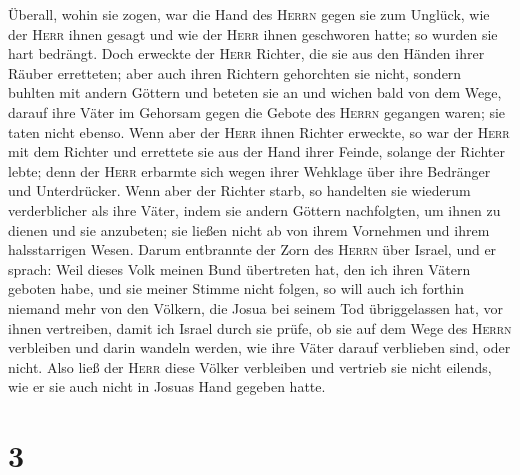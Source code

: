 Überall, wohin sie zogen, war die Hand des \textsc{Herrn} gegen sie zum
Unglück, wie der \textsc{Herr} ihnen gesagt und wie der \textsc{Herr}
ihnen geschworen hatte; so wurden sie hart bedrängt. 
Doch erweckte der \textsc{Herr} Richter, die sie aus den Händen ihrer
Räuber erretteten;  aber auch ihren Richtern gehorchten
sie nicht, sondern buhlten mit andern Göttern und beteten sie an und
wichen bald von dem Wege, darauf ihre Väter im Gehorsam gegen die Gebote
des \textsc{Herrn} gegangen waren; sie taten nicht ebenso.
 Wenn aber der \textsc{Herr} ihnen Richter erweckte, so
war der \textsc{Herr} mit dem Richter und errettete sie aus der Hand
ihrer Feinde, solange der Richter lebte; denn der \textsc{Herr} erbarmte
sich wegen ihrer Wehklage über ihre Bedränger und Unterdrücker.
 Wenn aber der Richter starb, so handelten sie wiederum
verderblicher als ihre Väter, indem sie andern Göttern nachfolgten, um
ihnen zu dienen und sie anzubeten; sie ließen nicht ab von ihrem
Vornehmen und ihrem halsstarrigen Wesen.  Darum
entbrannte der Zorn des \textsc{Herrn} über Israel, und er sprach: Weil
dieses Volk meinen Bund übertreten hat, den ich ihren Vätern geboten
habe, und sie meiner Stimme nicht folgen,  so will auch
ich forthin niemand mehr von den Völkern, die Josua bei seinem Tod
übriggelassen hat, vor ihnen vertreiben,  damit ich
Israel durch sie prüfe, ob sie auf dem Wege des \textsc{Herrn}
verbleiben und darin wandeln werden, wie ihre Väter darauf verblieben
sind, oder nicht.  Also ließ der \textsc{Herr} diese
Völker verbleiben und vertrieb sie nicht eilends, wie er sie auch nicht
in Josuas Hand gegeben hatte.

\hypertarget{section-2}{%
\section{3}\label{section-2}}

